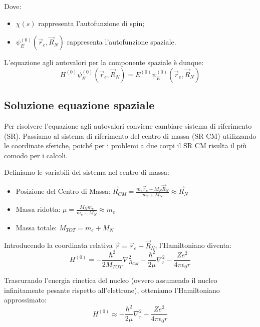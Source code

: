 Dove:
\begin{itemize}
    \item \(\chi(s)\) rappresenta l'autofunzione di spin;
    \item \(\psi_E^{(0)}(\vec{r}_e, \vec{R}_N)\) rappresenta l'autofunzione spaziale.
\end{itemize}

L'equazione agli autovalori per la componente spaziale è dunque:
\begin{equation}
    H^{(0)} \psi_E^{(0)}(\vec{r}_e, \vec{R}_N) = E^{(0)} \psi_E^{(0)}(\vec{r}_e, \vec{R}_N)
\end{equation}

\subsection{Soluzione equazione spaziale}
Per risolvere l'equazione agli autovalori conviene cambiare sistema di riferimento (SR). Passiamo al sistema di riferimento del centro di massa (SR CM) utilizzando le coordinate sferiche, poiché per i problemi a due corpi il SR CM risulta il più comodo per i calcoli.

Definiamo le variabili del sistema nel centro di massa:
\begin{itemize}
    \item Posizione del Centro di Massa: \(\vec{R}_{CM} = \frac{m_e \vec{r}_e + M_N \vec{R}_N}{m_e + M_N} \approx \vec{R}_N\)
    \item Massa ridotta: \(\mu = \frac{M_N m_e}{m_e + M_N} \approx m_e\)
    \item Massa totale: \(M_{TOT} = m_e + M_N\)
\end{itemize}

Introducendo la coordinata relativa \(\vec{r} = \vec{r}_e - \vec{R}_N\), l'Hamiltoniano diventa:
\begin{equation}
    H^{(0)} = -\frac{\hbar^2}{2M_{TOT}} \nabla_{R_{CM}}^2 - \frac{\hbar^2}{2\mu} \nabla_{r}^2 - \frac{Ze^2}{4\pi\epsilon_0 r}
\end{equation}

Trascurando l'energia cinetica del nucleo (ovvero assumendo il nucleo infinitamente pesante rispetto all'elettrone), otteniamo l'Hamiltoniano approssimato:
\begin{equation}
    H^{(0)} \approx -\frac{\hbar^2}{2\mu} \nabla_{r}^2 - \frac{Ze^2}{4\pi\epsilon_0 r}
\end{equation}

